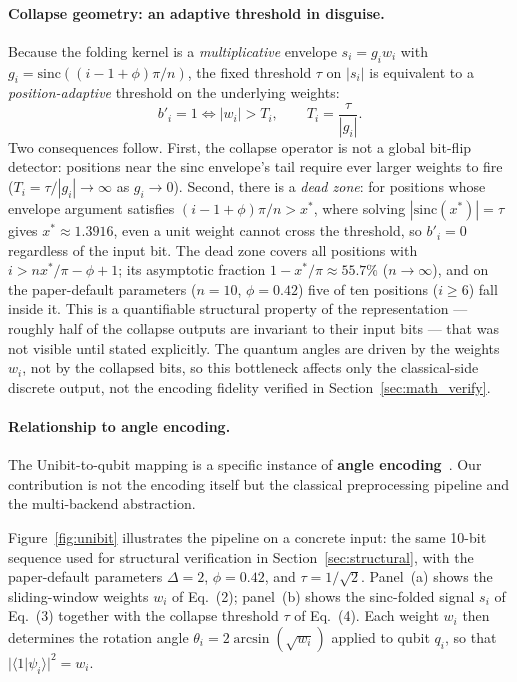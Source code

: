 ﻿\documentclass[12pt,a4paper]{article}
\begin{document}
\paragraph{Collapse geometry: an adaptive threshold in disguise.} Because the folding kernel is a \emph{multiplicative} envelope $s_i = g_i w_i$ with $g_i = \mathrm{sinc}((i-1+\phi)\pi/n)$, the fixed threshold $\tau$ on $|s_i|$ is equivalent to a \emph{position-adaptive} threshold on the underlying weights:
\begin{equation}
    b'_i = 1 \iff |w_i| > T_i, \qquad T_i = \frac{\tau}{|g_i|}.
    \label{eq:adaptivethreshold}
\end{equation}
Two consequences follow. First, the collapse operator is not a global bit-flip detector: positions near the sinc envelope's tail require ever larger weights to fire ($T_i = \tau/|g_i| \to \infty$ as $g_i \to 0$). Second, there is a \emph{dead zone}: for positions whose envelope argument satisfies $(i-1+\phi)\pi/n > x^*$, where solving $|\mathrm{sinc}(x^*)| = \tau$ gives $x^* \approx 1.3916$, even a unit weight cannot cross the threshold, so $b'_i = 0$ regardless of the input bit. The dead zone covers all positions with $i > n x^*/\pi - \phi + 1$; its asymptotic fraction $1 - x^*/\pi \approx 55.7\%$ ($n \to \infty$), and on the paper-default parameters ($n{=}10$, $\phi{=}0.42$) five of ten positions ($i \ge 6$) fall inside it. This is a quantifiable structural property of the representation --- roughly half of the collapse outputs are invariant to their input bits --- that was not visible until stated explicitly. The quantum angles are driven by the weights $w_i$, not by the collapsed bits, so this bottleneck affects only the classical-side discrete output, not the encoding fidelity verified in Section~\ref{sec:math_verify}.

\paragraph{Relationship to angle encoding.} The Unibit-to-qubit mapping is a specific instance of \textbf{angle encoding}~\cite{schuld2021,havlicek2019}. Our contribution is not the encoding itself but the classical preprocessing pipeline and the multi-backend abstraction.

Figure~\ref{fig:unibit} illustrates the pipeline on a concrete input: the same 10-bit sequence used for structural verification in Section~\ref{sec:structural}, with the paper-default parameters $\Delta = 2$, $\phi = 0.42$, and $\tau = 1/\sqrt{2}$. Panel~(a) shows the sliding-window weights $w_i$ of Eq.~(2); panel~(b) shows the sinc-folded signal $s_i$ of Eq.~(3) together with the collapse threshold $\tau$ of Eq.~(4). Each weight $w_i$ then determines the rotation angle $\theta_i = 2\arcsin(\sqrt{w_i})$ applied to qubit $q_i$, so that $|\langle 1 | \psi_i \rangle|^2 = w_i$.
\end{document}
